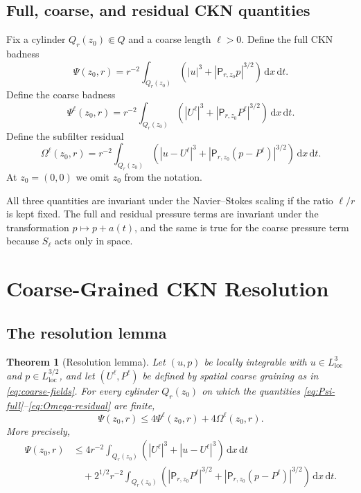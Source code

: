 \documentclass[10pt,a4paper]{amsart}
\numberwithin{equation}{section}
\newtheorem{theorem}{Theorem}[section]
\newcommand{\loc}{\mathrm{loc}}
\newcommand{\dxdt}{\,\mathrm dx\,\mathrm dt}
\newcommand{\Pf}{\mathsf P}
\begin{document}
\subsection{Full, coarse, and residual CKN quantities}

Fix a cylinder $Q_r(z_0)\Subset Q$ and a coarse length $\ell>0$.  Define the full CKN badness
\begin{equation}\label{eq:Psi-full}
\Psi(z_0,r)=r^{-2}\int_{Q_r(z_0)}\left(|u|^3+|\Pf_{r,z_0}p|^{3/2}\right)\dxdt.
\end{equation}
Define the coarse badness
\begin{equation}\label{eq:Psi-coarse}
\Psi^\ell(z_0,r)=r^{-2}\int_{Q_r(z_0)}\left(|U^\ell|^3+|\Pf_{r,z_0}P^\ell|^{3/2}\right)\dxdt.
\end{equation}
Define the subfilter residual
\begin{equation}\label{eq:Omega-residual}
\Omega^\ell(z_0,r)=r^{-2}\int_{Q_r(z_0)}\left(|u-U^\ell|^3+|\Pf_{r,z_0}(p-P^\ell)|^{3/2}\right)\dxdt.
\end{equation}
At $z_0=(0,0)$ we omit $z_0$ from the notation.

All three quantities are invariant under the Navier--Stokes scaling if the ratio $\ell/r$ is kept fixed.  The full and residual pressure terms are invariant under the transformation $p\mapsto p+a(t)$, and the same is true for the coarse pressure term because $S_\ell$ acts only in space.
\section{Coarse-Grained CKN Resolution}\label{sec:resolution-main}

\subsection{The resolution lemma}

\begin{theorem}[Resolution lemma]\label{thm:resolution}
Let $(u,p)$ be locally integrable with $u\in L^3_{\loc}$ and $p\in L^{3/2}_{\loc}$, and let $(U^\ell,P^\ell)$ be defined by spatial coarse graining as in \eqref{eq:coarse-fields}.  For every cylinder $Q_r(z_0)$ on which the quantities \eqref{eq:Psi-full}--\eqref{eq:Omega-residual} are finite,
\begin{equation}\label{eq:resolution-estimate}
\Psi(z_0,r)\le 4\Psi^\ell(z_0,r)+4\Omega^\ell(z_0,r).
\end{equation}
More precisely,
\begin{align}\label{eq:sharp-resolution-estimate}
\Psi(z_0,r)
&\le
4r^{-2}\int_{Q_r(z_0)}\left(|U^\ell|^3+|u-U^\ell|^3\right)\dxdt
\nonumber\\
&\quad+
2^{1/2}r^{-2}\int_{Q_r(z_0)}\left(|\Pf_{r,z_0}P^\ell|^{3/2}+|\Pf_{r,z_0}(p-P^\ell)|^{3/2}\right)\dxdt.
\end{align}
\end{theorem}
\end{document}
